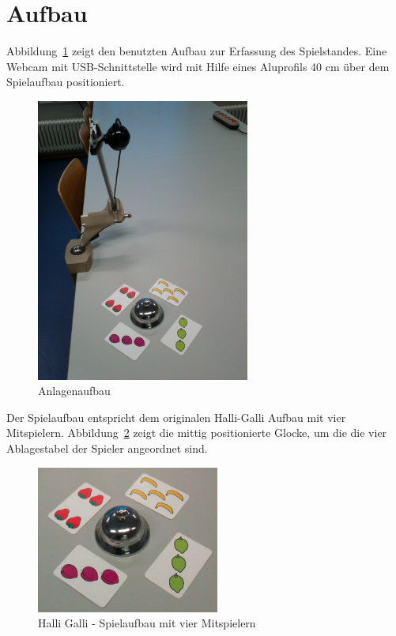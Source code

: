 
\section{Aufbau}
\label{sec:Kapitel}

Abbildung~\ref{fig:Anlage} zeigt den benutzten Aufbau zur Erfassung des Spielstandes. Eine Webcam mit USB-Schnittstelle wird mit Hilfe eines Aluprofils 40 cm über dem Spielaufbau positioniert.

\begin{figure}[]
    \centering
    \includegraphics[width=7cm]{Abbildungen/KameraAufbau}
    \caption[Anlage]{Anlagenaufbau}
    \label{fig:Anlage}
\end{figure}

Der Spielaufbau entspricht dem originalen Halli-Galli Aufbau mit vier Mitspielern. Abbildung~\ref{fig:Spielaufbau} zeigt die mittig positionierte Glocke, um die die vier Ablagestabel der Spieler angeordnet sind.

\begin{figure}[h]
    \centering
    \includegraphics[width=6cm]{Abbildungen/Aufbau4}
    \caption[Spielaufbau]{Halli Galli - Spielaufbau mit vier Mitspielern}
    \label{fig:Spielaufbau}
\end{figure}

